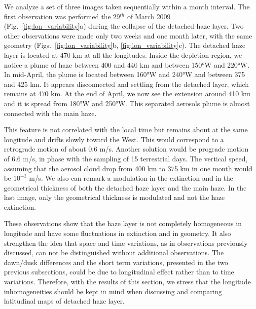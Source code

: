 We analyze a set of three images taken sequentially within a month interval. The first observation
was performed the 29$^{th}$ of March 2009 (Fig.~\ref{fig:lon_variability}a) during the collapse of the detached
haze layer. Two other observations were made only two weeks and one month later, with the same geometry
(Figs.~\ref{fig:lon_variability}b, \ref{fig:lon_variability}c). The detached haze layer is
located at 470 km at all the longitudes. Inside the depletion region, we notice a plume of haze
between 400 and 440 km and between \ang{150}W and \ang{220}W. In mid-April, the plume is located between
\ang{160}W and \ang{240}W and between 375 and 425 km. It appears disconnected and settling from the detached
layer, which remains at 470 km. At the end of April, we now see the extension around 410 km and it
is spread from \ang{180}W and \ang{250}W. This separated aerosols plume is almost connected with the main haze.

This feature is not correlated with the local time but remains about at the same longitude and drifts slowly
toward the West. This would correspond to a retrograde motion of about 0.6 m/s. Another solution would be
prograde motion of 6.6 m/s, in phase with the sampling of 15 terrestrial days. The vertical speed, assuming
that the aerosol cloud drop from 400 km to 375 km in one month would be $10^{-3}$ m/s. We also can remark a
modulation in the extinction and in the geometrical thickness of both the detached haze layer and the main
haze. In the last image, only the geometrical thickness is modulated and not the haze extinction.

These observations show that the haze layer is not completely homogeneous in longitude and have some
fluctuations in extinction and in geometry.
It also strengthen the idea that space and time variations, as in observations previously discussed,
can not be distinguished without additional observations. The dawn/dusk differences and the short term variations,
presented in the two previous subsections, could be due to longitudinal effect rather than to time variations.
Therefore, with the results of this section, we stress that the longitude inhomogeneities should be kept
in mind when discussing and comparing latitudinal maps of detached haze layer.
